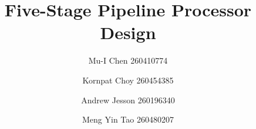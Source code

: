 \documentclass[conference]{IEEEtran}
\begin{document}
%
\title{Five-Stage Pipeline Processor Design}



\author{Mu-I Chen 260410774  \and Kornpat Choy 260454385 \and Andrew Jesson 260196340 \and Meng Yin Tao 260480207}


% 
\end{document}
